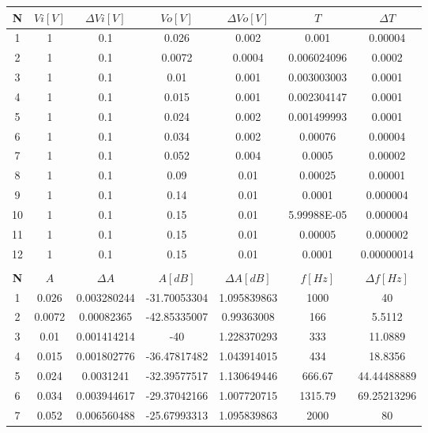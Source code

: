 \begin{table}[h!]
\centering
\begin{tabular}{|c|c|c|c|c|c|c|}
\hline
\textbf{N} & \textbf{\(Vi[V]\)} & \textbf{\(\varDelta Vi[V]\)} & \textbf{\(Vo[V]\)} & \textbf{\(\varDelta Vo[V]\)} & \textbf{\(T\)} & \textbf{\(\varDelta T\)} \\ \hline
1 & 1 & 0.1 & 0.026 & 0.002 & 0.001 & 0.00004 \\ \hline
2 & 1 & 0.1 & 0.0072 & 0.0004 & 0.006024096 & 0.0002 \\ \hline
3 & 1 & 0.1 & 0.01 & 0.001 & 0.003003003 & 0.0001 \\ \hline
4 & 1 & 0.1 & 0.015 & 0.001 & 0.002304147 & 0.0001 \\ \hline
5 & 1 & 0.1 & 0.024 & 0.002 & 0.001499993 & 0.0001 \\ \hline
6 & 1 & 0.1 & 0.034 & 0.002 & 0.00076 & 0.00004 \\ \hline
7 & 1 & 0.1 & 0.052 & 0.004 & 0.0005 & 0.00002 \\ \hline
8 & 1 & 0.1 & 0.09 & 0.01 & 0.00025 & 0.00001 \\ \hline
9 & 1 & 0.1 & 0.14 & 0.01 & 0.0001 & 0.000004 \\ \hline
10 & 1 & 0.1 & 0.15 & 0.01 & 5.99988E-05 & 0.000004 \\ \hline
11 & 1 & 0.1 & 0.15 & 0.01 & 0.00005 & 0.000002 \\ \hline
12 & 1 & 0.1 & 0.15 & 0.01 & 0.0001 & 0.00000014 \\ \hline
&&&&&&\\ \hline
\textbf{N} & \textbf{\(A\)} & \textbf{\(\varDelta A\)} & \textbf{\(A[dB]\)} & \textbf{\(\varDelta A[dB]\)} & \textbf{\(f[Hz]\)} & \textbf{\(\varDelta f[Hz]\)} \\ \hline
1 & 0.026 & 0.003280244 & -31.70053304 & 1.095839863 & 1000 & 40 \\ \hline
2 & 0.0072 & 0.00082365 & -42.85335007 & 0.99363008 & 166 & 5.5112 \\ \hline
3 & 0.01 & 0.001414214 & -40 & 1.228370293 & 333 & 11.0889 \\ \hline
4 & 0.015 & 0.001802776 & -36.47817482 & 1.043914015 & 434 & 18.8356 \\ \hline
5 & 0.024 & 0.0031241 & -32.39577517 & 1.130649446 & 666.67 & 44.44488889 \\ \hline
6 & 0.034 & 0.003944617 & -29.37042166 & 1.007720715 & 1315.79 & 69.25213296 \\ \hline
7 & 0.052 & 0.006560488 & -25.67993313 & 1.095839863 & 2000 & 80 \\ \hline

\end{tabular}
\end{table}
